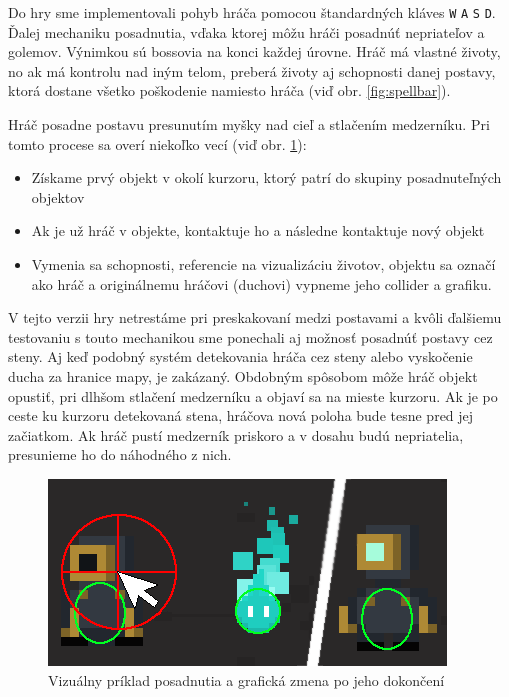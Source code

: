 Do hry sme implementovali pohyb hráča pomocou štandardných kláves \verb|W| \verb|A| \verb|S| \verb|D|. Ďalej mechaniku posadnutia, vďaka ktorej môžu hráči posadnúť nepriateľov a golemov. Výnimkou sú bossovia na konci každej úrovne. Hráč má vlastné životy, no ak má kontrolu nad iným telom, preberá životy aj schopnosti danej postavy, ktorá dostane všetko poškodenie namiesto hráča (viď obr. \ref{fig:spellbar}).

Hráč posadne postavu presunutím myšky nad cieľ a stlačením medzerníku. Pri tomto procese sa overí niekoľko vecí (viď obr. \ref{fig:possess-example}):

\begin{itemize}
    \item Získame prvý objekt v okolí kurzoru, ktorý patrí do skupiny posadnuteľných objektov
    \item Ak je už hráč v objekte, kontaktuje ho a následne kontaktuje nový objekt
    \item Vymenia sa schopnosti, referencie na vizualizáciu životov, objektu sa označí ako hráč a originálnemu hráčovi (duchovi) vypneme jeho collider a grafiku.
\end{itemize}

V tejto verzii hry netrestáme pri preskakovaní medzi postavami a kvôli ďalšiemu testovaniu s touto mechanikou sme ponechali aj možnosť posadnúť postavy cez steny. Aj keď podobný systém detekovania hráča cez steny alebo vyskočenie ducha za hranice mapy, je zakázaný. Obdobným spôsobom môže hráč objekt opustiť, pri dlhšom stlačení medzerníku a objaví sa na mieste kurzoru. Ak je po ceste ku kurzoru detekovaná stena, hráčova nová poloha bude tesne pred jej začiatkom. Ak hráč pustí medzerník priskoro a v dosahu budú nepriatelia, presunieme ho do náhodného z nich.

\begin{figure} [H]
    \centering
    \includegraphics[width=0.75\linewidth]{obrazky-figures/possess-example.png}
    \caption{Vizuálny príklad posadnutia a grafická zmena po jeho dokončení}
    \label{fig:possess-example}
\end{figure}

